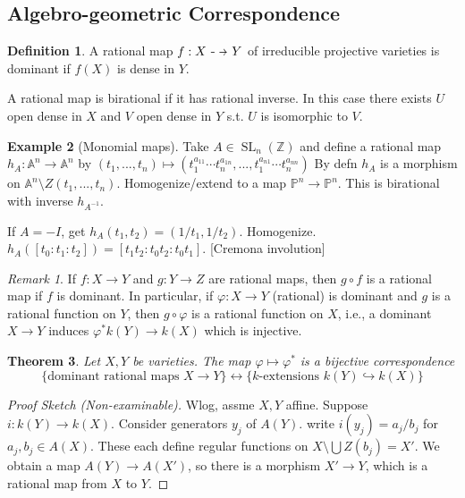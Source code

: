\documentclass{article}
\theoremstyle{definition}
\newtheorem{defn}{Definition}[section]
\newtheorem{example}[defn]{Example}
\theoremstyle{remark}
\newtheorem{rem}{Remark}
\theoremstyle{plain}
\newtheorem{thm}[defn]{Theorem}
\newcommand{\ZZ}{\mathbb{Z}}
\newcommand{\PP}{\mathbb{P}}
\newcommand{\bA}{\mathbb{A}}
\newcommand\dashto{\mathrel{
  -\mkern-6mu{\to}\mkern-20mu{\color{white}\bullet}\mkern12mu
}}
\begin{document}
\subsection{Algebro-geometric Correspondence}
\begin{defn}
    A rational map $f:X\dashto Y$ of irreducible projective varieties is dominant if $f(X)$ is dense in $Y$.
\end{defn}
A rational map is birational if it has rational inverse. In this case  there exists $U$ open dense in $X$ and $V$ open dense in $Y$ s.t. $U$ is isomorphic to  $V$.
\begin{example}[Monomial maps]
    Take $A\in\operatorname{SL}_n(\ZZ)$ and define a rational map $h_A:\bA^n\to \bA^n$ by $(t_1,...,t_n)\mapsto (t_1^{a_{11}}\cdots t_n^{a_{1n}},...,t_1^{a_{n1}}\cdots t_n^{a_{nn}})$ By defn $h_A$ is a morphism on $\bA^n\setminus Z(t_1,...,t_n)$. Homogenize/extend to a map $\PP^n\to\PP^n$. This is birational with inverse $h_{A^{-1}}$.

    If $A=-I$, get $h_A(t_1,t_2)=(1/t_1,1/t_2)$. Homogenize. $h_A([t_0:t_1:t_2])=[t_1t_2:t_0t_2:t_0t_1]$. [Cremona involution]
\end{example}
\begin{rem}
    If $f:X\to Y$ and $g:Y\to Z$ are rational maps, then $g\circ f$ is a rational map if $f$ is dominant. In particular, if $\varphi:X\to Y$ (rational) is dominant and $g$ is a rational function on $Y$, then $g\circ \varphi$ is a rational function on $X$, i.e., a dominant $X\to Y$ induces $\varphi^\ast k(Y)\to k(X)$ which is injective.
\end{rem}
\begin{thm}
    Let $X,Y$ be varieties. The map $\varphi\mapsto\varphi^\ast$ is a bijective correspondence 
    \[\{\text{dominant rational maps }X\to Y\}\leftrightarrow\{k\text{-extensions }k(Y)\hookrightarrow k(X)\}\]
\end{thm}
\begin{proof}[Proof Sketch (Non-examinable)]
    Wlog, assme $X,Y$ affine. Suppose $i:k(Y)\to k(X)$. Consider generators $y_j$ of $A(Y)$. write $i(y_j)=a_j/b_j$ for $a_j,b_j\in A(X)$. These each define regular functions on $X\setminus\bigcup Z(b_j)=X'$. We obtain a map $A(Y)\to A(X')$, so there is a morphism $X'\to Y$, which is a rational map from $X$ to $Y$.
\end{proof}
\end{document}

